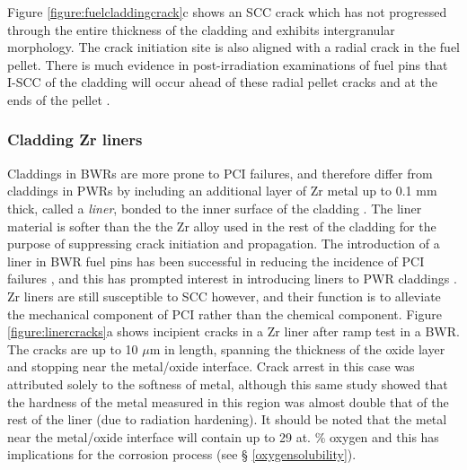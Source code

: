 Figure \ref{figure:fuelcladdingcrack}c shows an SCC crack which has not progressed through the entire thickness of the cladding and exhibits intergranular morphology. The crack initiation site is also aligned with a radial crack in the fuel pellet. There is much evidence in post-irradiation examinations of fuel pins that I-SCC of the cladding will occur ahead of these radial pellet cracks and at the ends of the pellet \cite{Peehs2009, Haddad1983, haynes2015modelling, Wood1975, Nobrega1985, Syrett1981, Shimada1983}.

\subsubsection{Cladding Zr liners}

Claddings in BWRs are more prone to PCI failures, and therefore differ from claddings in PWRs by including an additional layer of Zr metal up to 0.1 mm thick, called a \emph{liner}, bonded to the inner surface of the cladding \cite{Kitano2006, Takagi1996}. The liner material is softer than the the Zr alloy used in the rest of the cladding for the purpose of suppressing crack initiation and propagation. The introduction of a liner in BWR fuel pins has been successful in reducing the incidence of PCI failures \cite{andersson2003fuel, klinger2003experience}, and this has prompted interest in introducing liners to PWR claddings \cite{groeschel2003failure}. Zr liners are still susceptible to SCC however, and their function is to alleviate the mechanical component of PCI rather than the chemical component. Figure \ref{figure:linercracks}a shows incipient cracks in a Zr liner after ramp test in a BWR. The cracks are up to 10 $\mu$m in length, spanning the thickness of the oxide layer and stopping near the metal/oxide interface. Crack arrest in this case was attributed solely to the softness of metal, although this same study showed that the hardness of the metal measured in this region was almost double that of the rest of the liner (due to radiation hardening). It should be noted that the metal near the metal/oxide interface will contain up to 29 at. \% oxygen and this has implications for the corrosion process (see § \ref{oxygensolubility}).

